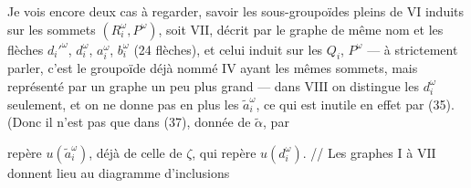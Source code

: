 \documentclass[11pt,a4paper]{article}
\begin{document}
Je vois encore deux cas à regarder, savoir les sous-groupoïdes pleins de $\mathrm{VI}$ induits sur les  sommets $(R_i^{\omega}, P^{\omega})$, soit $\mathrm{VII}$, décrit par le graphe de même nom et les flèches $d_i'^{\omega}$, $d_i^{\omega}$, $a_i^{\omega}$, $b_i^{\omega}$ (24 flèches), et celui induit sur les   $Q_i$, $P^{\omega}$ — à strictement parler, c'est le groupoïde déjà nommé $\mathrm{IV}$ ayant les mêmes  sommets, mais représenté par un graphe un peu plus grand — dans $\mathrm{VIII}$ on distingue les   $d_i^{\omega}$ seulement, et on ne donne pas en plus les $\tilde a_i^{\omega}$, ce qui est inutile en effet par (35). (Donc il n'est pas  que dans (37),  donnée de $\tilde\alpha$, par

 repère  $u(\tilde a_i^{\omega})$,  déjà de celle de $\zeta$, qui repère  $u(d_i^{\omega})$. // Les graphes $\mathrm{I}$ à $\mathrm{VII}$ donnent lieu au diagramme d'inclusions

\end{document}

